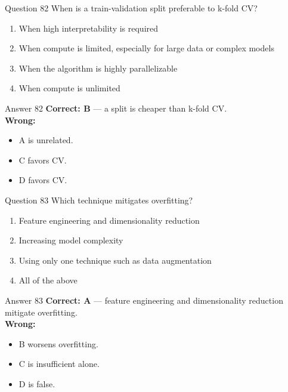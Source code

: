 \documentclass[aspectratio=169,11pt]{beamer}
\begin{document}
	\begin{frame}{Question 82}
		When is a train-validation split preferable to k-fold CV?
		\begin{enumerate}[label=\Alph*.]
			\item When high interpretability is required
			\item When compute is limited, especially for large data or complex models
			\item When the algorithm is highly parallelizable
			\item When compute is unlimited
		\end{enumerate}
	\end{frame}
	\begin{frame}{Answer 82}
		\textbf{Correct: B} --- a split is cheaper than k-fold CV.\\
		\vspace{0.5em}
		\textbf{Wrong:}
		\begin{itemize}
			\item A is unrelated.
			\item C favors CV.
			\item D favors CV.
		\end{itemize}
	\end{frame}
	
	\begin{frame}{Question 83}
		Which technique mitigates overfitting?
		\begin{enumerate}[label=\Alph*.]
			\item Feature engineering and dimensionality reduction
			\item Increasing model complexity
			\item Using only one technique such as data augmentation
			\item All of the above
		\end{enumerate}
	\end{frame}
	\begin{frame}{Answer 83}
		\textbf{Correct: A} --- feature engineering and dimensionality reduction mitigate overfitting.\\
		\vspace{0.5em}
		\textbf{Wrong:}
		\begin{itemize}
			\item B worsens overfitting.
			\item C is insufficient alone.
			\item D is false.
		\end{itemize}
	\end{frame}
	
\end{document}

